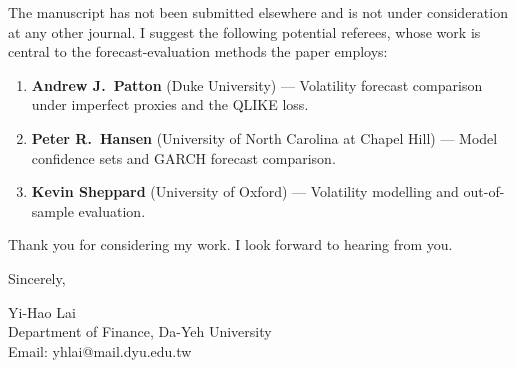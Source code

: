 \documentclass[11pt,a4paper]{article}
\begin{document}
The manuscript has not been submitted elsewhere and is not under consideration at any other journal. I suggest the following potential referees, whose work is central to the forecast-evaluation methods the paper employs:

\begin{enumerate}[nosep]
\item \textbf{Andrew J.\ Patton} (Duke University) --- Volatility forecast comparison under imperfect proxies and the QLIKE loss.
\item \textbf{Peter R.\ Hansen} (University of North Carolina at Chapel Hill) --- Model confidence sets and GARCH forecast comparison.
\item \textbf{Kevin Sheppard} (University of Oxford) --- Volatility modelling and out-of-sample evaluation.
\end{enumerate}

\noindent Thank you for considering my work. I look forward to hearing from you.

\bigskip

\noindent
Sincerely,

\bigskip

\noindent
Yi-Hao Lai\\
Department of Finance, Da-Yeh University\\
Email: yhlai@mail.dyu.edu.tw
\end{document}
